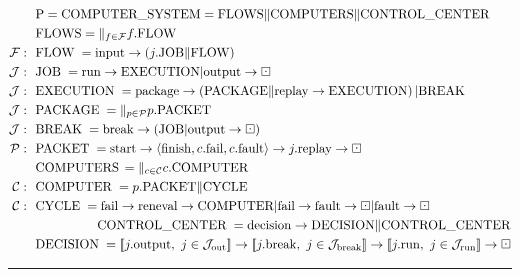 \noindent
    \begin{align*}
    &\  \ \mathrm{P}=\mbox{COMPUTER\_SYSTEM} = \mbox{FLOWS}\Vert 
\mbox{COMPUTERS}\Vert \mbox{CONTROL\_CENTER}
    \\
   &\ \ \mbox{FLOWS} = \Vert_{f\in \mathcal{F}} f.\mbox{FLOW}
   \\
  \mathcal{F}: &\ \ \mbox{FLOW}\;= \mathrm{input} \rightarrow \left(j.\mathrm{JOB}\Vert 
\mathrm{FLOW}\right)\\
\mathcal{J}: &\ \ \mbox{JOB}\;= \mathrm{run} \rightarrow \mathrm{EXECUTION}\vert \mathrm{output} 
\rightarrow\boxdot\\
\mathcal{J}: &\ \ \mbox{EXECUTION}\;= \mathrm{package} \rightarrow \left( \mathrm{PACKAGE}\Vert \mathrm{replay} 
\rightarrow  \mathrm{EXECUTION}\right) \vert \mathrm{BREAK}\\
\mathcal{J}: &\  \ \mbox{PACKAGE}\;= \Vert_{p\in \mathcal{P}}p.\mbox{PACKET}\\
\mathcal{J}: &\ \ \mbox{BREAK}\;= \mathrm{break} \rightarrow \left( \mathrm{JOB}\vert \mathrm{output} 
\rightarrow \boxdot \right)\\
\mathcal{P}: &\ \ \mbox{PACKET}\;= \mathrm{start} \rightarrow \langle \mathrm{finish}, 
c.\mathrm{fail}, c.\mathrm{fault}\rangle 
\rightarrow j.\mathrm{replay} \rightarrow \boxdot\\
   &\ \ \mbox{COMPUTERS}\,= \Vert_{c\in \mathcal{C}} c.\mbox{COMPUTER}\\
\mathcal{C}: &\ \ \mbox{COMPUTER}\;= p.\mbox{PACKET} \Vert \mbox{CYCLE}\\
\mathcal{C}:&\  \ \mbox{CYCLE}\;= \mathrm{fail} \rightarrow  \mathrm{reneval} 
\rightarrow \mbox{COMPUTER} \vert 
\mathrm{fail} \rightarrow \mathrm{fault} \rightarrow \boxdot \vert \mathrm{fault} 
\rightarrow \boxdot\\
   &\ \ \hspace{17mm} \mbox{CONTROL\_CENTER}\;=\mathrm{decision} \rightarrow 
\mbox{DECISION}\Vert \mbox{CONTROL\_CENTER}\\
   &\ \ \mbox{DECISION}\;=[\![j.\mathrm{output},\ j\in 
   \mathcal{J}_{\mathrm{out}}]\!] \rightarrow [\![j.\mathrm{break},\ j\in 
\mathcal{J}_{\mathrm{break}}]\!] \rightarrow [\![j.\mathrm{run},\ j\in 
\mathcal{J}_{\mathrm{run}}]\!]\rightarrow \boxdot
   \end{align*}
   
   \hrule
   
